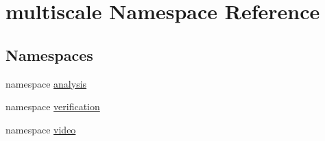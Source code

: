 \hypertarget{namespacemultiscale}{\section{multiscale \-Namespace \-Reference}
\label{namespacemultiscale}
}
\subsection*{\-Namespaces}
\begin{DoxyCompactItemize}
\item 
namespace \hyperlink{namespacemultiscale_1_1analysis}{analysis}
\item 
namespace \hyperlink{namespacemultiscale_1_1verification}{verification}
\item 
namespace \hyperlink{namespacemultiscale_1_1video}{video}
\end{DoxyCompactItemize}
